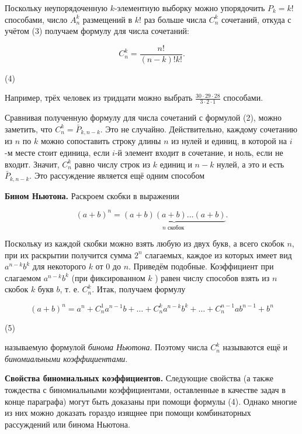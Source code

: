 Поскольку неупорядоченную $k$-элементную выборку можно упорядочить $P_k=k!$ способами, число $A_n^k$ размещений в $k!$ раз больше числа $C_n^k$ сочетаний, откуда с учётом (3) получаем формулу для числа сочетаний:

$$
C_n^k=\frac{n!}{(n-k)!k!} .
$$
\begin{flushright}
        \vspace{-10mm}
        (4)
\end{flushright}


Например, трёх человек из тридцати можно выбрать $\frac{30 \cdot 29 \cdot 28}{3 \cdot 2 \cdot 1}$ способами.

Сравнивая полученную формулу для числа сочетаний с формулой (2), можно заметить, что $C_n^k=\bar{P}_{k, n-k}$. Это не случайно. Действительно, каждому сочетанию из $n$ по $k$ можно сопоставить строку длины $n$ из нулей и единиц, в которой на $i$-м месте стоит единица, если $i$-й элемент входит в сочетание, и ноль, если не входит. Значит, $C_n^k$ равно числу строк из $k$ единиц и $n-k$ нулей, а это и есть $\bar{P}_{k, n-k}$. Это рассуждение является ещё одним способом

\textbf{Бином Ньютона.} Раскроем скобки в выражении

$$
(a+b)^n=\underbrace{(a+b)(a+b) \ldots(a+b)}_{n \text { скобок }} .
$$


Поскольку из каждой скобки можно взять любую из двух букв, а всего скобок $n$, при их раскрытии получится сумма $2^n$ слагаемых, каждое из которых имеет вид $a^{n-k} b^k$ для некоторого $k$ от 0 до $n$. Приведём подобные. Коэффициент при слагаемом $a^{n-k} b^k$ (при фиксированном $k$ ) равен числу способов взять из $n$ скобок $k$ букв $b$, т. е. $C_n^k$. Итак, получаем формулу

$$
(a+b)^n=a^n+C_n^1 a^{n-1} b+\ldots+C_n^k a^{n-k} b^k+\ldots+C_n^{n-1} a b^{n-1}+b^n
$$
\begin{flushright}
        \vspace{-10mm}
        (5)
\end{flushright}

называемую формулой \textit{бинома Ньютона}. Поэтому числа $C_n^k$ называются ещё и \textit{биномиальными коэффициентами}.

\textbf{Свойства биномиальных коэффициентов.} Следующие свойства (а также тождества с биномиальными коэффициентами, оставленные в качестве задач в конце параграфа) могут быть доказаны при помощи формулы (4). Однако многие из них можно доказать гораздо изящнее при помощи комбинаторных рассуждений или бинома Ньютона.

